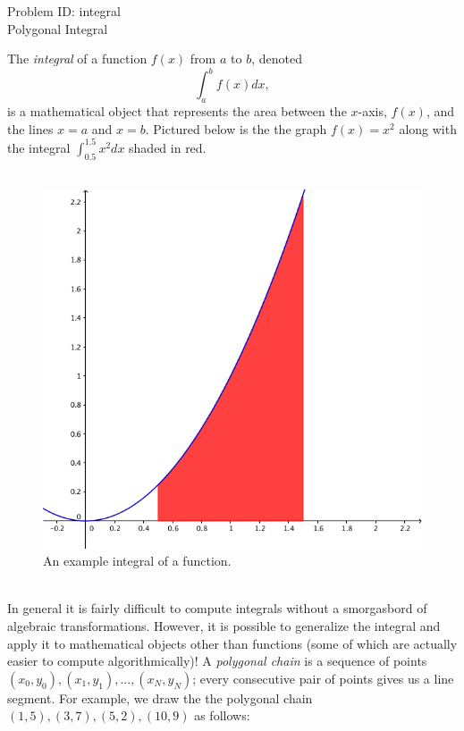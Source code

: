 \documentclass[a4paper,11pt]{article}
\begin{document}
\begin{center}
{\Huge Problem ID: integral}\vspace{2 mm} \\	%
{\huge Polygonal Integral}\vspace{2 mm} \\	%
\end{center}
\setcounter{page}{7}
\large{
The \emph{integral} of a function $f(x)$ from $a$ to $b$, denoted $$\int_{a}^{b}f(x)dx,$$ is a mathematical object that represents the area between the $x$-axis, $f(x)$, and the lines $x=a$ and $x=b$. Pictured below is the the graph $f(x)=x^2$ along with the integral $\int_{0.5}^{1.5} x^2dx$ shaded in red.\\\\
\begin{figure}[!htb]
    \centering
        \centering
        \includegraphics[width=0.8\linewidth, height=0.25\textheight]{integral.png}
        \caption{An example integral of a function.}
\end{figure}
\\In general it is fairly difficult to compute integrals without a smorgasbord of algebraic transformations. However, it is possible to generalize the integral and apply it to mathematical objects other than functions (some of which are actually easier to compute algorithmically)! A \emph{polygonal chain} is a sequence of points $(x_0, y_0), (x_1, y_1), ..., (x_N, y_N)$; every consecutive pair of points gives us a line segment. For example, we draw the the polygonal chain $(1, 5), (3, 7), (5, 2), (10, 9)$ as follows:\\\\
}
\end{document}
